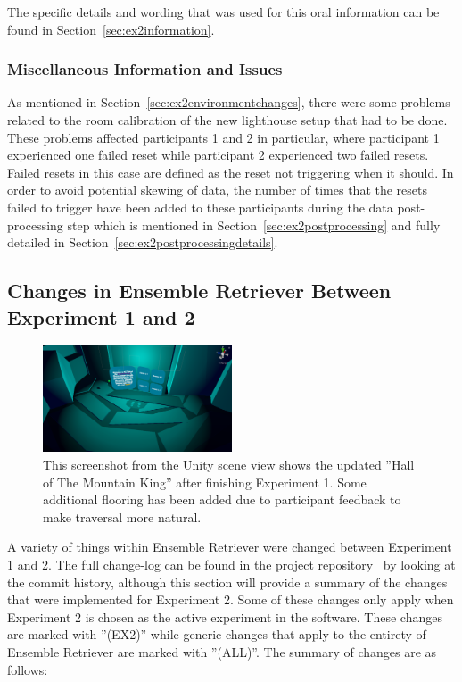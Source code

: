The specific details and wording that was used for this oral information can be found in Section~\ref{sec:ex2information}.

\subsubsection{Miscellaneous Information and Issues}
As mentioned in Section~\ref{sec:ex2environmentchanges}, there were some problems related to the room calibration of the new lighthouse setup that had to be done. These problems affected participants 1 and 2 in particular, where participant 1 experienced one failed reset while participant 2 experienced two failed resets. Failed resets in this case are defined as the reset not triggering when it should. In order to avoid potential skewing of data, the number of times that the resets failed to trigger have been added to these participants during the data post-processing step which is mentioned in Section~\ref{sec:ex2postprocessing} and fully detailed in Section~\ref{sec:ex2postprocessingdetails}. 

\subsection{Changes in Ensemble Retriever Between Experiment 1 and 2}\label{sec:changesBetweenExperiments}
\begin{figure}[tbph]
    \centering
    \includegraphics[width=0.5\textwidth]{figures/screenshots/HallOfTheMountainKingWithNewFloor.png}
    \caption[Screenshot of the ''Hall of The Mountain King'' Post Experiment 1]{This screenshot from the Unity scene view shows the updated ''Hall of The Mountain King'' after finishing Experiment 1. Some additional flooring has been added due to participant feedback to make traversal more natural.}
    \label{fig:mkhallWithFloor}
\end{figure}

A variety of things within Ensemble Retriever were changed between Experiment 1 and 2. The full change-log can be found in the project repository~\cite{projectRepository} by looking at the commit history, although this section will provide a summary of the changes that were implemented for Experiment 2. Some of these changes only apply when Experiment 2 is chosen as the active experiment in the software. These changes are marked with ''(EX2)'' while generic changes that apply to the entirety of Ensemble Retriever are marked with ''(ALL)''. The summary of changes are as follows:

